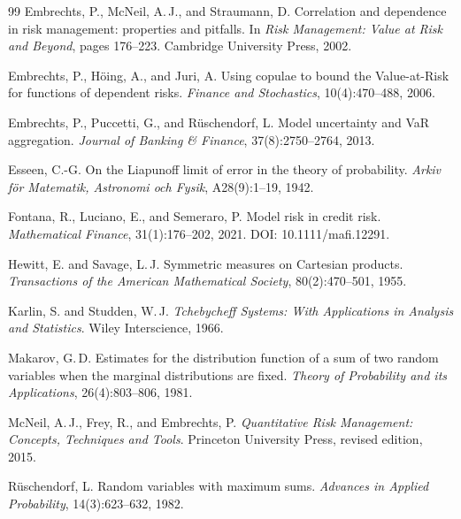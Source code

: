 \documentclass[11pt]{article}
\theoremstyle{definition}
\newcommand{\1}{\mathbf{1}}
\begin{document}
\begin{thebibliography}{99}
Embrechts, P., McNeil, A.\,J., and Straumann, D.
\newblock Correlation and dependence in risk management: properties and pitfalls.
\newblock In \emph{Risk Management: Value at Risk and Beyond}, pages 176--223. Cambridge University Press, 2002.

Embrechts, P., H\"oing, A., and Juri, A.
\newblock Using copulae to bound the Value-at-Risk for functions of dependent risks.
\newblock \emph{Finance and Stochastics}, 10(4):470--488, 2006.

Embrechts, P., Puccetti, G., and R\"uschendorf, L.
\newblock Model uncertainty and VaR aggregation.
\newblock \emph{Journal of Banking \& Finance}, 37(8):2750--2764, 2013.

Esseen, C.-G.
\newblock On the Liapunoff limit of error in the theory of probability.
\newblock \emph{Arkiv f\"or Matematik, Astronomi och Fysik}, A28(9):1--19, 1942.

Fontana, R., Luciano, E., and Semeraro, P.
\newblock Model risk in credit risk.
\newblock \emph{Mathematical Finance}, 31(1):176--202, 2021.
\newblock DOI: 10.1111/mafi.12291.

Hewitt, E. and Savage, L.\,J.
\newblock Symmetric measures on Cartesian products.
\newblock \emph{Transactions of the American Mathematical Society}, 80(2):470--501, 1955.

Karlin, S. and Studden, W.\,J.
\newblock \emph{Tchebycheff Systems: With Applications in Analysis and Statistics}.
\newblock Wiley Interscience, 1966.

Makarov, G.\,D.
\newblock Estimates for the distribution function of a sum of two random variables when the marginal distributions are fixed.
\newblock \emph{Theory of Probability and its Applications}, 26(4):803--806, 1981.

McNeil, A.\,J., Frey, R., and Embrechts, P.
\newblock \emph{Quantitative Risk Management: Concepts, Techniques and Tools}.
\newblock Princeton University Press, revised edition, 2015.

R\"uschendorf, L.
\newblock Random variables with maximum sums.
\newblock \emph{Advances in Applied Probability}, 14(3):623--632, 1982.


\end{thebibliography}
\end{document}
